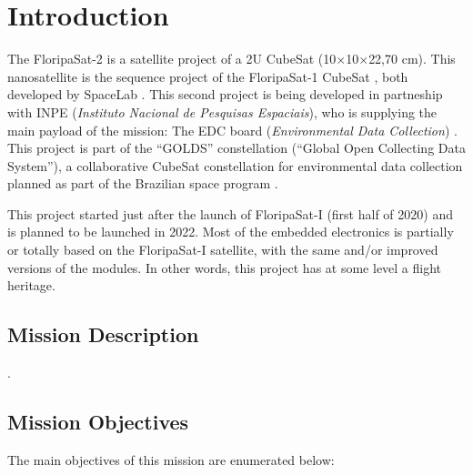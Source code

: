%
%
%
%
%

%
%
%
%
%
%

\chapter{Introduction} \label{ch:introduction}

The FloripaSat-2 is a satellite project of a 2U CubeSat (10$\times$10$\times$22,70 cm). This nanosatellite is the sequence project of the FloripaSat-1 CubeSat \cite{floripasat}, both developed by SpaceLab \cite{spacelab}. This second project is being developed in partneship with INPE (\textit{Instituto Nacional de Pesquisas Espaciais}), who is supplying the main payload of the mission: The EDC board (\textit{Environmental Data Collection}) \cite{edc}. This project is part of the ``GOLDS'' constellation (``Global Open Collecting Data System''), a collaborative CubeSat constellation for environmental data collection planned as part of the Brazilian space program \cite{golds}.

This project started just after the launch of FloripaSat-I (first half of 2020) and is planned to be launched in 2022. Most of the embedded electronics is partially or totally based on the FloripaSat-I satellite, with the same and/or improved versions of the modules. In other words, this project has at some level a flight heritage.

\section{Mission Description}

.

\section{Mission Objectives}

The main objectives of this mission are enumerated below:

